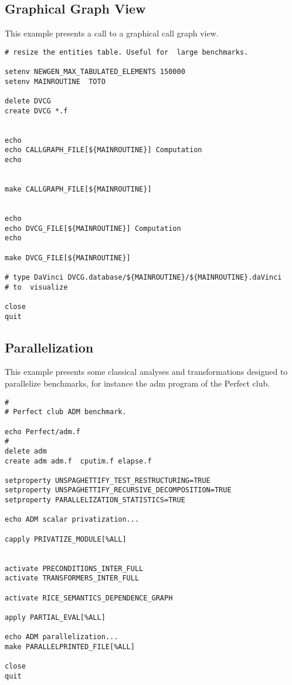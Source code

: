 \documentclass[a4paper,12pt]{article}
\begin{document}
\subsection{Graphical  Graph View}
\label{exm5}
This example presents a call to a graphical call graph view. 

\begin{verbatim}
# resize the entities table. Useful for  large benchmarks. 

setenv NEWGEN_MAX_TABULATED_ELEMENTS 150000
setenv MAINROUTINE  TOTO 

delete DVCG
create DVCG *.f


echo
echo CALLGRAPH_FILE[${MAINROUTINE}] Computation
echo


make CALLGRAPH_FILE[${MAINROUTINE}]


echo
echo DVCG_FILE[${MAINROUTINE}] Computation
echo

make DVCG_FILE[${MAINROUTINE}]

# type DaVinci DVCG.database/${MAINROUTINE}/${MAINROUTINE}.daVinci
# to  visualize 

close 
quit
\end{verbatim}

\subsection{Parallelization}
\label{exm6}
This example presents some classical analyses and transformations designed
to parallelize benchmarks, for instance the adm program of the Perfect
club. 

\begin{verbatim}
#
# Perfect club ADM benchmark.

echo Perfect/adm.f
#
delete adm
create adm adm.f  cputim.f elapse.f 

setproperty UNSPAGHETTIFY_TEST_RESTRUCTURING=TRUE
setproperty UNSPAGHETTIFY_RECURSIVE_DECOMPOSITION=TRUE
setproperty PARALLELIZATION_STATISTICS=TRUE

echo ADM scalar privatization...
 
capply PRIVATIZE_MODULE[%ALL]


activate PRECONDITIONS_INTER_FULL
activate TRANSFORMERS_INTER_FULL

activate RICE_SEMANTICS_DEPENDENCE_GRAPH

apply PARTIAL_EVAL[%ALL]

echo ADM parallelization...
make PARALLELPRINTED_FILE[%ALL]

close
quit
\end{verbatim}
\end{document}
